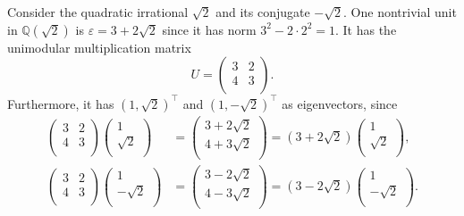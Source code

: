 \begin{example}
  \label{ex:sqrt2-unit}
  Consider the quadratic irrational $\sqrt{2}$
  and its conjugate $-\sqrt{2}$.
  One nontrivial unit in $ℚ(\sqrt{2})$ is $ε = 3 + 2\sqrt{2}$
  since it has norm $3^2 - 2 · 2^2 = 1$.
  It has the unimodular multiplication matrix
  \[
    U = \begin{pmatrix}
      3 & 2 \\
      4 & 3 \\
    \end{pmatrix}.
  \]
  Furthermore, it has $(1, \sqrt{2})^⊤$ and $(1, -\sqrt{2})^⊤$ as eigenvectors,
  since
  \begin{align*}
    \begin{pmatrix}
      3 & 2 \\
      4 & 3 \\
    \end{pmatrix}
    \begin{pmatrix}
      1 \\ \sqrt{2} \\
    \end{pmatrix}
    & =
    \begin{pmatrix}
      3 + 2\sqrt{2} \\
      4 + 3\sqrt{2} \\
    \end{pmatrix}
    =
    (3 + 2\sqrt{2})
    \begin{pmatrix}
      1 \\ \sqrt{2} \\
    \end{pmatrix}, \\
    \begin{pmatrix}
      3 & 2 \\
      4 & 3 \\
    \end{pmatrix}
    \begin{pmatrix}
      1 \\ -\sqrt{2} \\
    \end{pmatrix}
    & =
    \begin{pmatrix}
      3 - 2\sqrt{2} \\
      4 - 3\sqrt{2} \\
    \end{pmatrix}
    =
    (3 - 2\sqrt{2})
    \begin{pmatrix}
      1 \\ -\sqrt{2} \\
    \end{pmatrix}.
  \end{align*}
\end{example}
